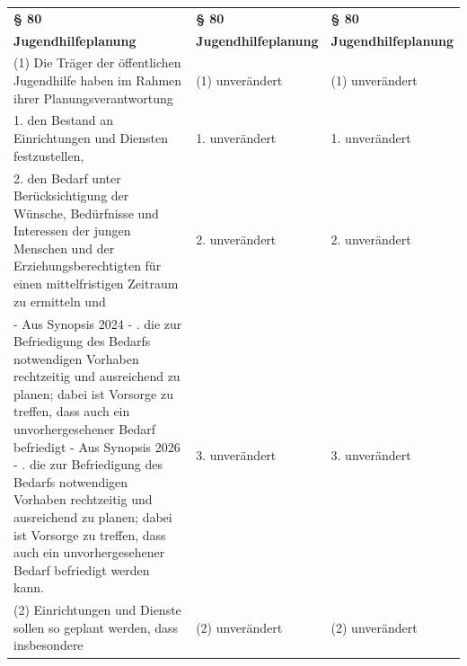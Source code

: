 \documentclass[10pt,a4paper,landscape]{article}
\begin{document}
\begin{longtable}{|L{8.2cm}|L{8.2cm}|L{8.2cm}|}
\hhline{|---|}
\textbf{\S{} 80} & \textbf{\S{} 80} & \textbf{\S{} 80} \\
\hhline{|---|}
\textbf{Jugendhilfeplanung} & \textbf{Jugendhilfeplanung} & \textbf{Jugendhilfeplanung} \\
\hhline{|---|}
(1) Die Träger der öffentlichen Jugendhilfe  \newline haben im Rahmen ihrer  \newline Planungsverantwortung & (1) unverändert & (1) unverändert \\
\hhline{|---|}
1.  \newline den Bestand an Einrichtungen und  \newline Diensten festzustellen, & 1. unverändert & 1. unverändert \\
\hhline{|---|}
2.  \newline den Bedarf unter Berücksichtigung der  \newline Wünsche, Bedürfnisse und Interessen der  \newline jungen Menschen und der  \newline Erziehungsberechtigten für einen  \newline mittelfristigen Zeitraum zu ermitteln und & 2. unverändert & 2. unverändert \\
\hhline{|---|}
- Aus Synopsis 2024 - .  \newline die zur Befriedigung des Bedarfs  \newline notwendigen Vorhaben rechtzeitig und  \newline ausreichend zu planen; dabei ist Vorsorge  \newline zu treffen, dass auch ein  \newline unvorhergesehener Bedarf befriedigt  \newline - Aus Synopsis 2026 - .  \newline die zur Befriedigung des Bedarfs  \newline notwendigen Vorhaben rechtzeitig und  \newline ausreichend zu planen; dabei ist Vorsorge  \newline zu treffen, dass auch ein  \newline unvorhergesehener Bedarf befriedigt  \newline werden kann. & 3. unverändert & 3. unverändert \\
\hhline{|---|}
(2) Einrichtungen und Dienste sollen so  \newline geplant werden, dass insbesondere & (2) unverändert & (2) unverändert \\

\end{longtable}
\end{document}
